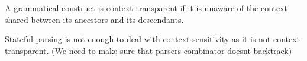 	A grammatical construct is context-transparent if it is unaware of the context shared between its ancestors and its descendants.
	
	Stateful parsing is not enough to deal with context sensitivity as it is not context-transparent. (We need to make sure that parsers combinator doesnt backtrack)



